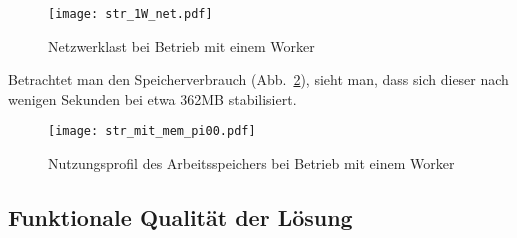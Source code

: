 \begin{figure}[ht!]
	\centering
	\texttt{[image: str\_1W\_net.pdf]}
	\caption{Netzwerklast bei Betrieb mit einem Worker}
	\label{figure:str_1W_net}
\end{figure}

Betrachtet man den Speicherverbrauch (Abb.~\ref{figure:str_mit_mem_pi00}), sieht man, dass sich dieser nach wenigen Sekunden bei etwa 362MB stabilisiert.

\begin{figure}[ht!]
	\centering
	\texttt{[image: str\_mit\_mem\_pi00.pdf]}
	\caption{Nutzungsprofil des Arbeitsspeichers bei Betrieb mit einem Worker}
	\label{figure:str_mit_mem_pi00}
\end{figure}

\subsection{Funktionale Qualität der Lösung}
